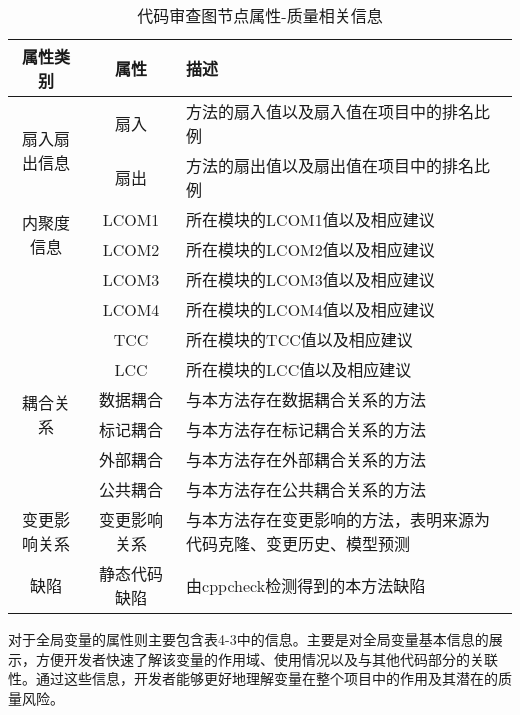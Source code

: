 \begin{table}[htbp]
    \caption{代码审查图节点属性-质量相关信息}
    \vspace{0.5em}\centering\wuhao
    \begin{tabular}{ccp{9cm}}
    \toprule
    属性类别 & 属性 & 描述 \\
    \midrule
    \multirow{2}{*}{扇入扇出信息}& 扇入 &  方法的扇入值以及扇入值在项目中的排名比例 \\       
                                & 扇出 &  方法的扇出值以及扇出值在项目中的排名比例 \\   \cline{2-3}
    \multirow{2}{*}{内聚度信息}& LCOM1 &  所在模块的LCOM1值以及相应建议 \\       
                                & LCOM2 &  所在模块的LCOM2值以及相应建议 \\    
                                & LCOM3 &  所在模块的LCOM3值以及相应建议 \\    
                                & LCOM4 &  所在模块的LCOM4值以及相应建议 \\    
                                & TCC &  所在模块的TCC值以及相应建议 \\    
                                & LCC &  所在模块的LCC值以及相应建议 \\   \cline{2-3}             
    \multirow{2}{*}{耦合关系}& 数据耦合 &  与本方法存在数据耦合关系的方法 \\       
                                & 标记耦合 &  与本方法存在标记耦合关系的方法 \\   
                                & 外部耦合 &  与本方法存在外部耦合关系的方法 \\   
                                & 公共耦合 &  与本方法存在公共耦合关系的方法 \\   \cline{2-3}
    变更影响关系 & 变更影响关系 &  与本方法存在变更影响的方法，表明来源为代码克隆、变更历史、模型预测 \\    \cline{2-3}
    缺陷 & 静态代码缺陷 &  由cppcheck检测得到的本方法缺陷 \\      
    \bottomrule
    \end{tabular}
    \end{table}

对于全局变量的属性则主要包含表4-3中的信息。主要是对全局变量基本信息的展示，方便开发者快速了解该变量的作用域、使用情况以及与其他代码部分的关联性。通过这些信息，开发者能够更好地理解变量在整个项目中的作用及其潜在的质量风险。

